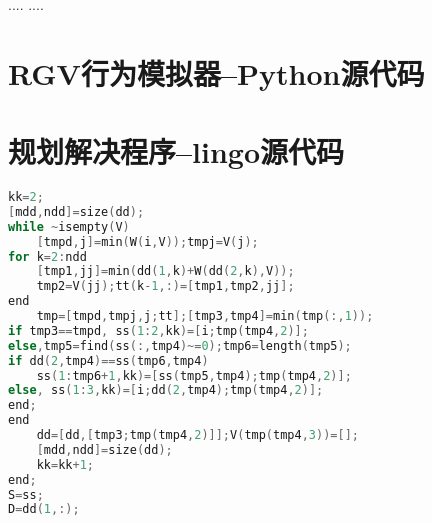 \documentclass{cumcmthesis}
\begin{document}
\begin{thebibliography}{9}%
  ....
  ....
\end{thebibliography}

\newpage
\begin{appendices}
\section{RGV行为模拟器--Python源代码}
%

\section{规划解决程序--lingo源代码}
\begin{lstlisting}[language=c]
kk=2;
[mdd,ndd]=size(dd);
while ~isempty(V)
    [tmpd,j]=min(W(i,V));tmpj=V(j);
for k=2:ndd
    [tmp1,jj]=min(dd(1,k)+W(dd(2,k),V));
    tmp2=V(jj);tt(k-1,:)=[tmp1,tmp2,jj];
end
    tmp=[tmpd,tmpj,j;tt];[tmp3,tmp4]=min(tmp(:,1));
if tmp3==tmpd, ss(1:2,kk)=[i;tmp(tmp4,2)];
else,tmp5=find(ss(:,tmp4)~=0);tmp6=length(tmp5);
if dd(2,tmp4)==ss(tmp6,tmp4)
    ss(1:tmp6+1,kk)=[ss(tmp5,tmp4);tmp(tmp4,2)];
else, ss(1:3,kk)=[i;dd(2,tmp4);tmp(tmp4,2)];
end;
end
    dd=[dd,[tmp3;tmp(tmp4,2)]];V(tmp(tmp4,3))=[];
    [mdd,ndd]=size(dd);
    kk=kk+1;
end;
S=ss;
D=dd(1,:);
 \end{lstlisting}
\end{appendices}
\end{document}
